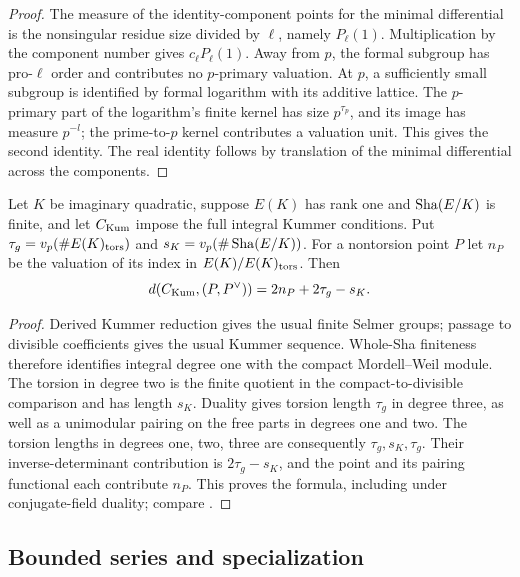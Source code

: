\begin{proof}
The measure of the identity-component points for the minimal
differential is the nonsingular residue size divided by $\ell$,
namely $P_\ell(1)$.  Multiplication by the component number gives
$c_\ell P_\ell(1)$.  Away from $p$, the formal subgroup has pro-$\ell$
order and contributes no $p$-primary valuation.  At $p$, a sufficiently
small subgroup is identified by formal logarithm with its additive
lattice.  The $p$-primary part of the logarithm's finite kernel has
size $p^{\tau_p}$, and its image has measure $p^{-l}$; the
prime-to-$p$ kernel contributes a valuation unit.  This gives the
second identity.  The real
identity follows by translation of the minimal differential across
the components.
\end{proof}

\begin{lemma}\label{models:kummer-volume}
Let $K$ be imaginary quadratic, suppose $E(K)$ has rank one and
$\operatorname{Sha}(E/K)$ is finite, and let $C_{\rm Kum}$ impose the full integral
Kummer conditions.  Put $\tau_g=v_p(\#E(K)_{\rm tors})$ and
$s_K=v_p(\#\operatorname{Sha}(E/K))$.  For a nontorsion point $P$ let $n_P$ be
the valuation of its index in $E(K)/E(K)_{\rm tors}$.  Then
\begin{equation}\label{models:kummer-volume-formula}
 d(C_{\rm Kum},(P,P^\vee))=2n_P+2\tau_g-s_K.
\end{equation}
\end{lemma}

\begin{proof}
Derived Kummer reduction gives the usual finite Selmer groups;
passage to divisible coefficients gives the usual Kummer sequence.
Whole-Sha finiteness therefore identifies integral degree one with
the compact Mordell--Weil module.  The torsion in degree two is the
finite quotient in the compact-to-divisible comparison and has
length $s_K$.  Duality gives torsion length $\tau_g$ in degree three,
as well as a unimodular pairing on the free parts in degrees one and
two.  The torsion lengths in degrees one, two, three are consequently
$\tau_g,s_K,\tau_g$.  Their inverse-determinant contribution is
$2\tau_g-s_K$, and the point and its pairing functional each
contribute $n_P$.  This proves the formula, including under
conjugate-field duality; compare \cite[Section 3, ``Central Kummer
lattices and local measures'']{B}.
\end{proof}

\subsection{Bounded series and specialization}

